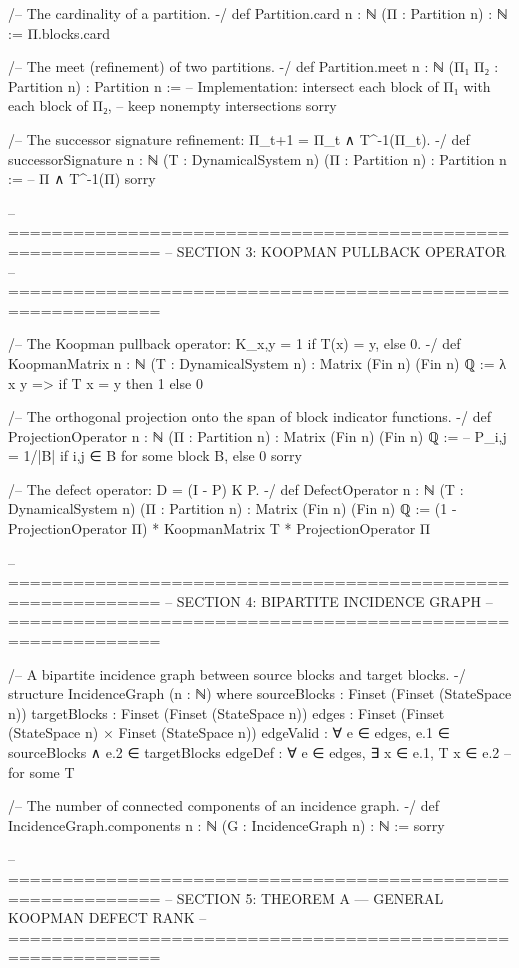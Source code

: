 /-- The cardinality of a partition. -/
def Partition.card {n : ℕ} (Π : Partition n) : ℕ := Π.blocks.card

/-- The meet (refinement) of two partitions. -/
def Partition.meet {n : ℕ} (Π₁ Π₂ : Partition n) : Partition n :=
  -- Implementation: intersect each block of Π₁ with each block of Π₂,
  -- keep nonempty intersections
  sorry

/-- The successor signature refinement: Π_{t+1} = Π_t ∧ T^{-1}(Π_t). -/
def successorSignature {n : ℕ} (T : DynamicalSystem n) (Π : Partition n) : Partition n :=
  -- Π ∧ T^{-1}(Π)
  sorry

-- ============================================================
-- SECTION 3: KOOPMAN PULLBACK OPERATOR
-- ============================================================

/-- The Koopman pullback operator: K_{x,y} = 1 if T(x) = y, else 0. -/
def KoopmanMatrix {n : ℕ} (T : DynamicalSystem n) : Matrix (Fin n) (Fin n) ℚ :=
  λ x y => if T x = y then 1 else 0

/-- The orthogonal projection onto the span of block indicator functions. -/
def ProjectionOperator {n : ℕ} (Π : Partition n) : Matrix (Fin n) (Fin n) ℚ :=
  -- P_{i,j} = 1/|B| if i,j ∈ B for some block B, else 0
  sorry

/-- The defect operator: D = (I - P) K P. -/
def DefectOperator {n : ℕ} (T : DynamicalSystem n) (Π : Partition n) : Matrix (Fin n) (Fin n) ℚ :=
  (1 - ProjectionOperator Π) * KoopmanMatrix T * ProjectionOperator Π

-- ============================================================
-- SECTION 4: BIPARTITE INCIDENCE GRAPH
-- ============================================================

/-- A bipartite incidence graph between source blocks and target blocks. -/
structure IncidenceGraph (n : ℕ) where
  sourceBlocks : Finset (Finset (StateSpace n))
  targetBlocks : Finset (Finset (StateSpace n))
  edges : Finset (Finset (StateSpace n) × Finset (StateSpace n))
  edgeValid : ∀ e ∈ edges, e.1 ∈ sourceBlocks ∧ e.2 ∈ targetBlocks
  edgeDef : ∀ e ∈ edges, ∃ x ∈ e.1, T x ∈ e.2  -- for some T

/-- The number of connected components of an incidence graph. -/
def IncidenceGraph.components {n : ℕ} (G : IncidenceGraph n) : ℕ :=
  sorry

-- ============================================================
-- SECTION 5: THEOREM A — GENERAL KOOPMAN DEFECT RANK
-- ============================================================

